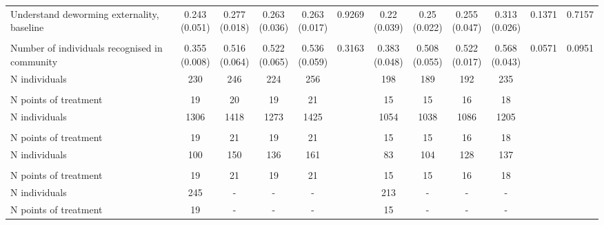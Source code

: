 {\begin{tabular}[t]{lccccccccccc}
\hspace{1em}Understand deworming externality, baseline & \makecell[c]{0.243\\(0.051)} & \makecell[c]{0.277\\(0.018)} & \makecell[c]{0.263\\(0.036)} & \makecell[c]{0.263\\(0.017)} & 0.9269 & \makecell[c]{0.22\\(0.039)} & \makecell[c]{0.25\\(0.022)} & \makecell[c]{0.255\\(0.047)} & \makecell[c]{0.313\\(0.026)} & 0.1371 & 0.7157\\
\addlinespace[0.3em]
\multicolumn{12}{l}{\textbf{Baseline Sample}}\\
\hline
\hspace{1em}Number of individuals recognised in community & \makecell[c]{0.355\\(0.008)} & \makecell[c]{0.516\\(0.064)} & \makecell[c]{0.522\\(0.065)} & \makecell[c]{0.536\\(0.059)} & 0.3163 & \makecell[c]{0.383\\(0.048)} & \makecell[c]{0.508\\(0.055)} & \makecell[c]{0.522\\(0.017)} & \makecell[c]{0.568\\(0.043)} & 0.0571 & 0.0951\\
\hspace{1em}N individuals & 230 & 246 & 224 & 256 &  & 198 & 189 & 192 & 235 &  & \\
\addlinespace[0.3em]
\multicolumn{12}{l}{\textbf{Takeup Sample}}\\
\hline
\hspace{1em}N points of treatment & 19 & 20 & 19 & 21 &  & 15 & 15 & 16 & 18 &  & \\
\hspace{1em}N individuals & 1306 & 1418 & 1273 & 1425 &  & 1054 & 1038 & 1086 & 1205 &  & \\
\addlinespace[0.3em]
\multicolumn{12}{l}{\textbf{Belief Sample}}\\
\hline
\hspace{1em}N points of treatment & 19 & 21 & 19 & 21 &  & 15 & 15 & 16 & 18 &  \vphantom{1} & \\
\hspace{1em}N individuals & 100 & 150 & 136 & 161 &  & 83 & 104 & 128 & 137 &  & \\
\addlinespace[0.3em]
\multicolumn{12}{l}{\textbf{WTP Sample}}\\
\hline
\hspace{1em}N points of treatment & 19 & 21 & 19 & 21 &  & 15 & 15 & 16 & 18 &  & \\
\hspace{1em}N individuals & 245 & - & - & - &  & 213 & - & - & - &  & \\
N points of treatment & 19 & - & - & - &  & 15 & - & - & - &  & \\
\bottomrule
\end{tabular}}

